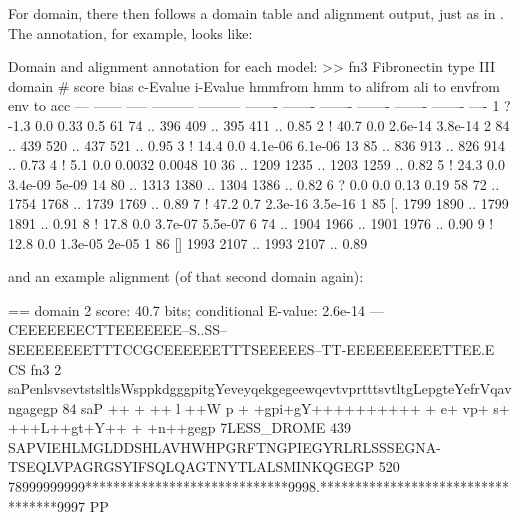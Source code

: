 For domain, there then follows a domain table and alignment output,
just as in . The  annotation, for example,
looks like:

\begin{sreoutput}
Domain and alignment annotation for each model:
>> fn3  Fibronectin type III domain
   #    score  bias  c-Evalue  i-Evalue hmmfrom  hmm to    alifrom  ali to    envfrom  env to     acc
 ---   ------ ----- --------- --------- ------- -------    ------- -------    ------- -------    ----
   1 ?   -1.3   0.0      0.33       0.5      61      74 ..     396     409 ..     395     411 .. 0.85
   2 !   40.7   0.0   2.6e-14   3.8e-14       2      84 ..     439     520 ..     437     521 .. 0.95
   3 !   14.4   0.0   4.1e-06   6.1e-06      13      85 ..     836     913 ..     826     914 .. 0.73
   4 !    5.1   0.0    0.0032    0.0048      10      36 ..    1209    1235 ..    1203    1259 .. 0.82
   5 !   24.3   0.0   3.4e-09     5e-09      14      80 ..    1313    1380 ..    1304    1386 .. 0.82
   6 ?    0.0   0.0      0.13      0.19      58      72 ..    1754    1768 ..    1739    1769 .. 0.89
   7 !   47.2   0.7   2.3e-16   3.5e-16       1      85 [.    1799    1890 ..    1799    1891 .. 0.91
   8 !   17.8   0.0   3.7e-07   5.5e-07       6      74 ..    1904    1966 ..    1901    1976 .. 0.90
   9 !   12.8   0.0   1.3e-05     2e-05       1      86 []    1993    2107 ..    1993    2107 .. 0.89
\end{sreoutput}

and an example alignment (of that second domain again):

\begin{sreoutput}
  == domain 2    score: 40.7 bits;  conditional E-value: 2.6e-14
                  ---CEEEEEEECTTEEEEEEE--S..SS--SEEEEEEEETTTCCGCEEEEEETTTSEEEEES--TT-EEEEEEEEEETTEE.E CS
          fn3   2 saPenlsvsevtstsltlsWsppkdgggpitgYeveyqekgegeewqevtvprtttsvtltgLepgteYefrVqavngagegp 84 
                  saP   ++ +  ++ l ++W p +  +gpi+gY++++++++++  + e+ vp+   s+ +++L++gt+Y++ +  +n++gegp
  7LESS_DROME 439 SAPVIEHLMGLDDSHLAVHWHPGRFTNGPIEGYRLRLSSSEGNA-TSEQLVPAGRGSYIFSQLQAGTNYTLALSMINKQGEGP 520
                  78999999999*****************************9998.**********************************9997 PP
\end{sreoutput}

